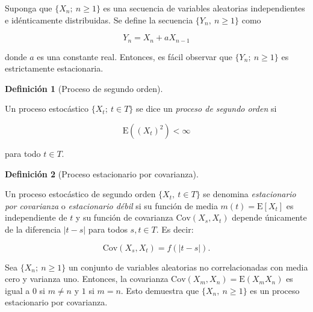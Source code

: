 \documentclass[
  us-letterpaper,
]{scrreprt}
\theoremstyle{plain}
\theoremstyle{definition}
\newtheorem{definition}{Definición}[chapter]
\theoremstyle{definition}
\theoremstyle{plain}
\theoremstyle{remark}
\begin{document}
\begin{tcolorbox}[enhanced jigsaw, bottomtitle=1mm, coltitle=black, breakable, leftrule=.75mm, left=2mm, rightrule=.15mm, titlerule=0mm, toprule=.15mm, toptitle=1mm, colback=white, colframe=quarto-callout-caution-color-frame, title={Ejemplo}, colbacktitle=quarto-callout-caution-color!10!white, arc=.35mm, bottomrule=.15mm, opacitybacktitle=0.6, opacityback=0]

Suponga que \(\{X_n;\ n \geq 1\}\) es una secuencia de variables
aleatorias independientes e idénticamente distribuidas. Se define la
secuencia \(\{Y_n,\ n \geq 1\}\) como

\[
Y_n=X_n+aX_{n-1}
\]

donde \(a\) es una constante real. Entonces, es fácil observar que
\(\{Y_n;\ n \geq 1\}\) es estrictamente estacionaria.

\end{tcolorbox}

\begin{definition}[Proceso de segundo
orden]\protect\hypertarget{def-SOP}{}\label{def-SOP}

Un proceso estocástico \(\{X_t;\ t\in T\}\) se dice un \emph{proceso de
segundo orden} si

\[
\mathrm{E}((X_t)^2)< \infty
\]

para todo \(t\in T\).

\end{definition}

\begin{definition}[Proceso estacionario por
covarianza]\protect\hypertarget{def-PEC}{}\label{def-PEC}

Un proceso estocástico de segundo orden \(\{X_t,\ t \in T\}\) se
denomina \emph{estacionario por covarianza} o \emph{estacionario débil}
si su función de media \(m(t) = \mathrm{E}[X_t]\) es independiente de
\(t\) y su función de covarianza \(\mathrm{Cov}(X_s, X_t)\) depende
únicamente de la diferencia \(|t - s|\) para todos \(s, t \in T\). Es
decir:

\[
\mathrm{Cov}(X_s,X_t)=f(|t-s|).
\]

\end{definition}

\begin{tcolorbox}[enhanced jigsaw, bottomtitle=1mm, coltitle=black, breakable, leftrule=.75mm, left=2mm, rightrule=.15mm, titlerule=0mm, toprule=.15mm, toptitle=1mm, colback=white, colframe=quarto-callout-caution-color-frame, title={Ejemplo}, colbacktitle=quarto-callout-caution-color!10!white, arc=.35mm, bottomrule=.15mm, opacitybacktitle=0.6, opacityback=0]

Sea \(\{X_n;\ n \geq 1\}\) un conjunto de variables aleatorias no
correlacionadas con media cero y varianza uno. Entonces, la covarianza
\(\mathrm{Cov}(X_m, X_n) = \mathrm{E}(X_mX_n)\) es igual a \(0\) si
\(m \ne n\) y \(1\) si \(m = n\). Esto demuestra que
\(\{X_n,\ n \ge 1\}\) es un proceso estacionario por covarianza.

\end{tcolorbox}
\end{document}
